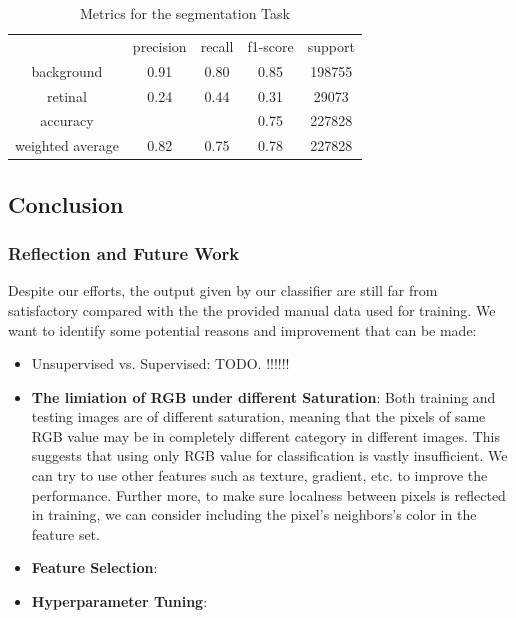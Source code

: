 \documentclass[12pt,letterpaper]{article}
\begin{document}
    \begin{table}[H]
        \caption{Metrics for the segmentation Task}
        \begin{tabular}{ccccc}
                         & precision & recall & f1-score & support \\
        background       & 0.91      & 0.80   & 0.85     & 198755  \\
        retinal          & 0.24      & 0.44   & 0.31     & 29073   \\
        accuracy         &           &        & 0.75     & 227828  \\
        weighted average & 0.82      & 0.75   & 0.78     & 227828  
        \end{tabular}
    \end{table}




\subsection{Conclusion}



\subsubsection{Reflection and Future Work}
Despite our efforts, the output given by our classifier are still far from satisfactory compared with the the provided manual data used for training. We want to identify some potential reasons and improvement that can be made:
\begin{itemize}
    \item Unsupervised vs. Supervised: TODO. !!!!!!
    \item \textbf{The limiation of RGB under different Saturation}: Both training and testing images are of different saturation, meaning that the pixels of same RGB value may be in completely different category in different images. This suggests that using only RGB value for classification is vastly insufficient. We can try to use other features such as texture, gradient, etc. to improve the performance. Further more, to make sure localness between pixels is reflected in training, we can consider including the pixel's neighbors's color in the feature set.

    \item \textbf{Feature Selection}: 
    
    \item \textbf{Hyperparameter Tuning}: 
\end{itemize}
\end{document}
